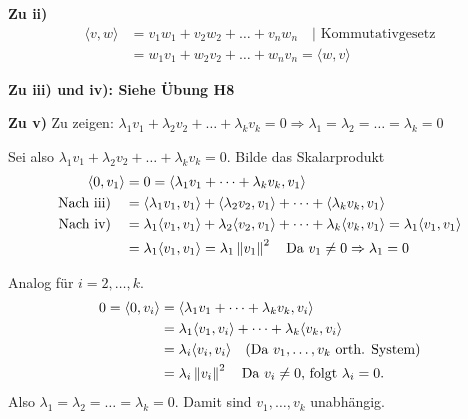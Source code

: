 \textbf{Zu ii)}
\begin{align*}
	\langle v, w\rangle &= v_1w_1+v_2w_2+\dots +v_nw_n\quad|\text{ Kommutativgesetz} \\
	&= w_1v_1+w_2v_2+\dots +w_nv_n = \langle w, v\rangle
\end{align*}

\textbf{Zu iii) und iv): Siehe Übung H8}

\textbf{Zu v)}
Zu zeigen: $\lambda_1v_1+\lambda_2v_2+\dots +\lambda_kv_k = 0 \Rightarrow \lambda_1 = \lambda_2 = \dots = \lambda_k = 0$

Sei also $\lambda_1v_1+\lambda_2v_2+\dots +\lambda_kv_k = 0$. Bilde das Skalarprodukt
\begin{align*}
	\langle 0, v_1\rangle &= 0 = \langle \lambda_1v_1+\dots +\lambda_kv_k, v_1\rangle \\
	\text{Nach iii)}\quad &= \langle \lambda_1v_1, v_1\rangle +\langle \lambda_2v_2, v_1\rangle+\dots +\langle \lambda_kv_k, v_1\rangle \\
	\text{Nach iv)}\quad &=\lambda_1\langle v_1, v_1\rangle + \lambda_2\langle v_2, v_1\rangle + \dots + \lambda_k\langle v_k, v_1\rangle = \lambda_1\langle v_1, v_1\rangle \\
	&= \lambda_1 \langle v_1, v_1\rangle = \lambda_1 \left\lVert v_1\right\rVert^2\quad\text{Da } v_1\neq 0 \Rightarrow \lambda_1 = 0
\end{align*}

Analog für $i=2,\dots,k$.
\begin{align*}
	0 = \langle 0, v_i\rangle &= \langle \lambda_1v_1 + \dots + \lambda_kv_k, v_i\rangle \\
	&= \lambda_1 \langle v_1, v_i\rangle + \dots + \lambda_k \langle v_k, v_i\rangle \\
	&= \lambda_i \langle v_i, v_i\rangle\quad\text{(Da $v_1,\dots,v_k$ orth. System)} \\
	&= \lambda_i \left\lVert v_i\right\rVert^2\quad\text{Da }v_i\neq 0\text{, folgt }\lambda_i = 0\text{.}
\end{align*}
Also $\lambda_1 = \lambda_2 = \dots = \lambda_k = 0$. Damit sind $v_1,\dots,v_k$ unabhängig.
